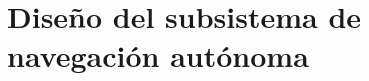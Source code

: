 \documentclass[../../General.tex]{subfiles}
\begin{document}
\section{Diseño del subsistema de navegación autónoma}
\end{document}
